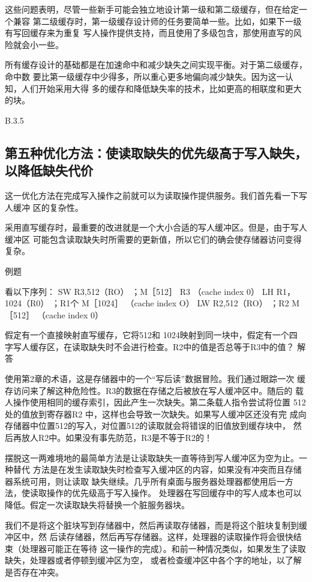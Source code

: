 这些问题表明，尽管一些新手可能会独立地设计第一级和第二级缓存，但在给定一个兼容
第二级缓存时，第一级缓存设计师的任务要简单一些。比如，如果下一级有写回缓存来为重复
写人操作提供支持，而且使用了多级包含，那使用直写的风险就会小一些。

所有缓存设计的基础都是在加速命中和减少缺失之间实现平衡。对于第二级缓存，命中数
要比第一级缓存中少得多，所以重心更多地偏向减少缺失。因为这一认知，人们开始采用大得
多的缓存和降低缺失率的技术，比如更高的相联度和更大的块。

B.3.5
\subsection{第五种优化方法：使读取缺失的优先级高于写入缺失，以降低缺失代价}
这一优化方法在完成写入操作之前就可以为读取操作提供服务。我们首先看一下写人缓冲
区的复杂性。

采用直写缓存时，最重要的改进就是一个大小合适的写人缓冲区。但是，由于写人缓冲区
可能包含读取缺失时所需要的更新值，所以它们的确会使存储器访问变得复杂。

例题

看以下序列：
SW R3,512（RO）
；M［512］ R3
（cache index 0）
LH R1，
1024（R0）
；R1个 M［1024］
（cache index O）
LW R2,512（RO）
；R2 M［512］
（cache index 0）

假定有一个直接映射直写缓存，它将512和 1024映射到同一块中，假定有一个四
字写人缓存区，在读取缺失时不会进行检查。R2中的值是否总等于R3中的值？
解答

使用第2章的术语，这是存储器中的一个“写后读”数据冒险。我们通过眼踪一次
缓存访问来了解这种危险性。R3的数据在存储之后被放在写人缓冲区中。随后的
载人操作使用相同的缓存索引，因此产生一次缺失。第二条载人指令尝试将位置
512 处的值放到寄存器R2 中，这样也会导致一次缺失。如果写人缓冲区还没有完
成向存储器中位置512的写入，对位置512的读取就会将错误的旧值放到缓存块中，
然后再放人R2中。如果没有事先防范，R3是不等于R2的！

摆脱这一两难境地的最简单方法是让读取缺失一直等待到写人缓冲区为空为止。一种替代
方法是在发生读取缺失时检查写入缓冲区的内容，如果没有冲突而且存储器系统可用，则让读取
缺失继续。几乎所有桌面与服务器处理器都使用后一方法，使读取操作的优先级高于写入操作。
处理器在写回缓存中的写人成本也可以降低。假定一次读取缺失将替换一个脏服务器块。

我们不是将这个脏块写到存储器中，然后再读取存储器，而是将这个脏块复制到缓冲区中，然
后读存储器，然后再写存储器。这样，处理器的读取操作将会很快结束（处理器可能正在等待
这一操作的完成）。和前一种情况类似，如果发生了读取缺失，处理器或者停顿到缓冲区为空，
或者检查缓冲区中各个字的地址，以了解是否存在冲突。

